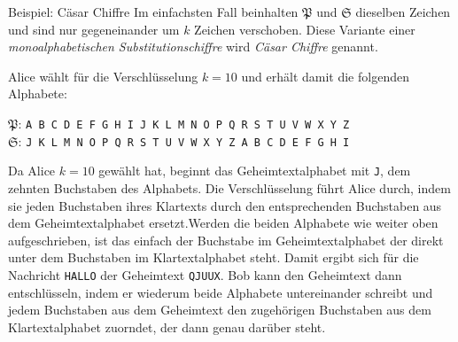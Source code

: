 \documentclass[german]{spicker}
\begin{document}
\begin{bonus}{Beispiel: Cäsar Chiffre}
    Im einfachsten Fall beinhalten $\mathfrak{P}$ und $\mathfrak{S}$ dieselben Zeichen und sind nur gegeneinander
    um $k$ Zeichen verschoben. Diese Variante einer \emph{monoalphabetischen Substitutionschiffre} wird \emph{Cäsar Chiffre} genannt.

    Alice wählt für die Verschlüsselung $k = 10$ und erhält damit die folgenden Alphabete:

    \begin{center}
        $\mathfrak{P}$: \texttt{A B C D E F G H I J K L M N O P Q R S T U V W X Y Z}\\
        $\mathfrak{S}$: \texttt{J K L M N O P Q R S T U V W X Y Z A B C D E F G H I}\\
    \end{center}

    Da Alice $k = 10$ gewählt hat, beginnt das Geheimtextalphabet mit \texttt{J}, dem
    zehnten Buchstaben des Alphabets. Die Verschlüsselung führt Alice durch,
    indem sie jeden Buchstaben ihres Klartexts durch den entsprechenden Buchstaben
    aus dem Geheimtextalphabet ersetzt.Werden die beiden Alphabete wie
    weiter oben aufgeschrieben, ist das einfach der Buchstabe im Geheimtextalphabet
    der direkt unter dem Buchstaben im Klartextalphabet steht. Damit ergibt
    sich für die Nachricht \texttt{HALLO} der Geheimtext \texttt{QJUUX}. Bob kann den
    Geheimtext dann entschlüsseln, indem er wiederum beide Alphabete untereinander
    schreibt und jedem Buchstaben aus dem Geheimtext den zugehörigen
    Buchstaben aus dem Klartextalphabet zuorndet, der dann genau darüber steht.
\end{bonus}
\end{document}

